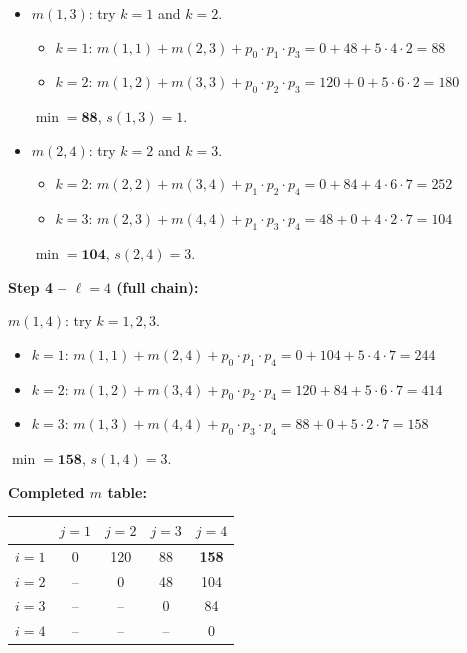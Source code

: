 \documentclass[12pt,portrait]{article}
\begin{document}
\begin{itemize}[leftmargin=*]
    \item $m(1,3)$: try $k=1$ and $k=2$.
    \begin{itemize}
        \item $k=1$: $m(1,1) + m(2,3) + p_0\cdot p_1\cdot p_3 = 0 + 48 + 5\cdot4\cdot2 = 88$
        \item $k=2$: $m(1,2) + m(3,3) + p_0\cdot p_2\cdot p_3 = 120 + 0 + 5\cdot6\cdot2 = 180$
    \end{itemize}
    $\min = \mathbf{88}$, $s(1,3)=1$.
    
    \item $m(2,4)$: try $k=2$ and $k=3$.
    \begin{itemize}
        \item $k=2$: $m(2,2) + m(3,4) + p_1\cdot p_2\cdot p_4 = 0 + 84 + 4\cdot6\cdot7 = 252$
        \item $k=3$: $m(2,3) + m(4,4) + p_1\cdot p_3\cdot p_4 = 48 + 0 + 4\cdot2\cdot7 = 104$
    \end{itemize}
    $\min = \mathbf{104}$, $s(2,4)=3$.
\end{itemize}

\textbf{Step 4 -- $\ell=4$ (full chain):}

$m(1,4)$: try $k=1,2,3$.
\begin{itemize}
    \item $k=1$: $m(1,1)+m(2,4)+p_0\cdot p_1\cdot p_4 = 0+104+5\cdot4\cdot7 = 244$
    \item $k=2$: $m(1,2)+m(3,4)+p_0\cdot p_2\cdot p_4 = 120+84+5\cdot6\cdot7 = 414$
    \item $k=3$: $m(1,3)+m(4,4)+p_0\cdot p_3\cdot p_4 = 88+0+5\cdot2\cdot7 = 158$
\end{itemize}
$\min = \mathbf{158}$, $s(1,4)=3$.

\textbf{Completed $m$ table:}

\begin{center}
\begin{tabular}{c|c|c|c|c}
\toprule
& $j=1$ & $j=2$ & $j=3$ & $j=4$ \\
\midrule
$i=1$ & 0 & 120 & 88 & \textbf{158} \\
$i=2$ & -- & 0 & 48 & 104 \\
$i=3$ & -- & -- & 0 & 84 \\
$i=4$ & -- & -- & -- & 0 \\
\bottomrule
\end{tabular}
\end{center}
\end{document}
